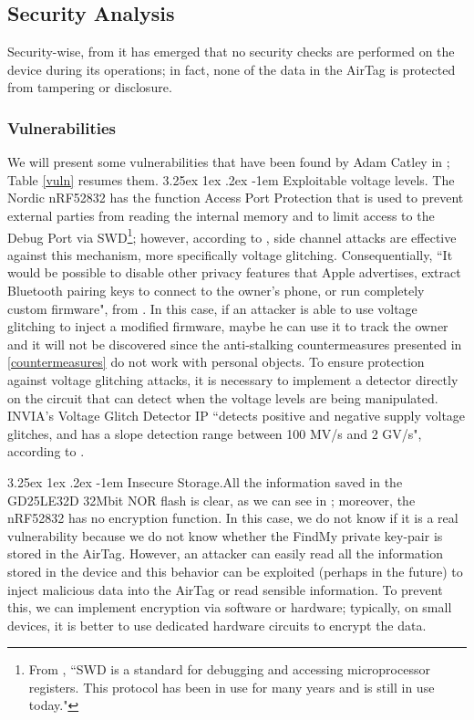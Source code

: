 \documentclass[english]{article}
\makeatletter
\renewcommand\paragraph{\@startsection{paragraph}{5}{\z@}%
  {3.25ex \@plus1ex \@minus.2ex}%
  {-1em}%
  {\normalfont\normalsize\bfseries}}
\makeatother
\begin{document}
\subsection{Security Analysis}\label{sec}
Security-wise, from \cite{reverse} it has emerged that no security checks are performed on the device during its operations; in fact, none of the data in the AirTag is protected from tampering or disclosure.
\subsubsection{Vulnerabilities}\label{sec:vuln}
We will present some vulnerabilities that have been found by Adam Catley in \cite{reverse}; Table \ref{vuln} resumes them.
\paragraph{Exploitable voltage levels.}
The Nordic nRF52832 has the function Access Port Protection \cite{nordicsemi} that is used to prevent external parties from reading the internal memory and to limit access to the Debug Port via SWD\footnote{From \cite{Oberli_2019}, ``SWD is a standard for debugging and accessing microprocessor registers. This protocol has been in use for many years and is still in use today."}; however, according to \cite{side}, side channel attacks are effective against this mechanism, more specifically voltage glitching. Consequentially, ``It would be possible to disable other privacy features that Apple advertises, extract Bluetooth pairing keys to connect to the owner’s phone, or run completely custom firmware", from \cite{reverse}. In this case, if an attacker is able to use voltage glitching to inject a modified firmware, maybe he can use it to track the owner and it will not be discovered since the anti-stalking countermeasures presented in \ref{countermeasures} do not work with personal objects. 
To ensure protection against voltage glitching attacks, it is necessary to implement a detector directly on the circuit that can detect when the voltage levels are being manipulated. INVIA's Voltage Glitch Detector IP ``detects positive and negative supply voltage glitches, and has a slope detection range between 100 MV/s and 2 GV/s", according to \cite{voltage}.

\paragraph{Insecure Storage.}All the information saved in the GD25LE32D 32Mbit NOR flash is clear, as we can see in \cite{tweet}; moreover, the nRF52832 has no encryption function. In this case, we do not know if it is a real vulnerability because we do not know whether the FindMy private key-pair is stored in the AirTag. However, an attacker can easily read all the information stored in the device and this behavior can be exploited (perhaps in the future) to inject malicious data into the AirTag or read sensible information. To prevent this, we can implement encryption via software or hardware; typically, on small devices, it is better to use dedicated hardware circuits to encrypt the data.
\end{document}
